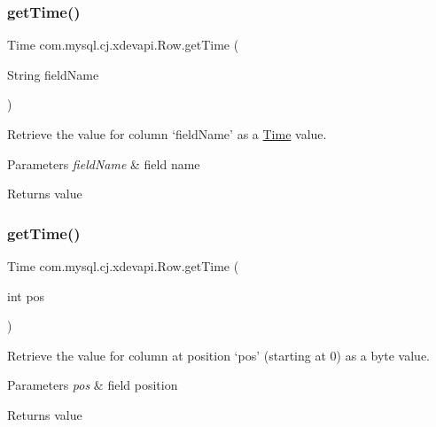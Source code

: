 \subsubsection{\texorpdfstring{get\+Time()}{getTime()}\hspace{0.1cm}{\footnotesize\ttfamily [1/2]}}
{\footnotesize\ttfamily Time com.\+mysql.\+cj.\+xdevapi.\+Row.\+get\+Time (\begin{DoxyParamCaption}\item[{String}]{field\+Name }\end{DoxyParamCaption})}

Retrieve the value for column `field\+Name' as a \mbox{\hyperlink{}{Time}} value.


\begin{DoxyParams}{Parameters}
{\em field\+Name} & field name \\
\hline
\end{DoxyParams}
\begin{DoxyReturn}{Returns}
value 
\end{DoxyReturn}
\mbox{\label{interfacecom_1_1mysql_1_1cj_1_1xdevapi_1_1_row_af8539bd76fe29bcae08571b10d0d2fe8}} 
\subsubsection{\texorpdfstring{get\+Time()}{getTime()}\hspace{0.1cm}{\footnotesize\ttfamily [2/2]}}
{\footnotesize\ttfamily Time com.\+mysql.\+cj.\+xdevapi.\+Row.\+get\+Time (\begin{DoxyParamCaption}\item[{int}]{pos }\end{DoxyParamCaption})}

Retrieve the value for column at position `pos' (starting at 0) as a byte value.


\begin{DoxyParams}{Parameters}
{\em pos} & field position \\
\hline
\end{DoxyParams}
\begin{DoxyReturn}{Returns}
value 
\end{DoxyReturn}
\mbox{\label{interfacecom_1_1mysql_1_1cj_1_1xdevapi_1_1_row_a5c5927af31f8f19fddb88925ab91d15b}} 
